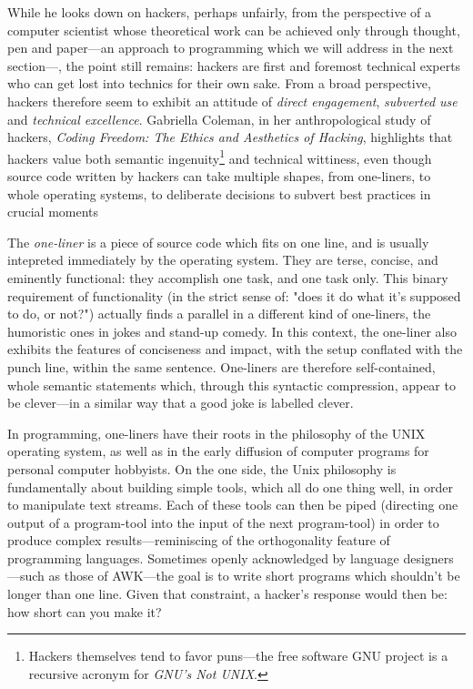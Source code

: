 While he looks down on hackers, perhaps unfairly, from the perspective of a computer scientist whose theoretical work can be achieved only through thought, pen and paper—an approach to programming which we will address in the next section—, the point still remains: hackers are first and foremost technical experts who can get lost into technics for their own sake. From a broad perspective, hackers therefore seem to exhibit an attitude of \emph{direct engagement}, \emph{subverted use} and \emph{technical excellence}.  Gabriella Coleman, in her anthropological study of hackers, \emph{Coding Freedom: The Ethics and Aesthetics of Hacking}, highlights that hackers value both semantic ingenuity\footnote{Hackers themselves tend to favor puns—the free software GNU project is a recursive acronym for \emph{GNU's Not UNIX}.} and technical wittiness, even though source code written by hackers can take multiple shapes, from one-liners, to whole operating systems, to deliberate decisions to subvert best practices in crucial moments

The \emph{one-liner} is a piece of source code which fits on one line, and is usually intepreted immediately by the operating system. They are terse, concise, and eminently functional: they accomplish one task, and one task only. This binary requirement of functionality (in the strict sense of: "does it do what it's supposed to do, or not?") actually finds a parallel in a different kind of one-liners, the humoristic ones in jokes and stand-up comedy. In this context, the one-liner also exhibits the features of conciseness and impact, with the setup conflated with the punch line, within the same sentence. One-liners are therefore self-contained, whole semantic statements which, through this syntactic compression, appear to be clever—in a similar way that a good joke is labelled clever.

In programming, one-liners have their roots in the philosophy of the UNIX operating system, as well as in the early diffusion of computer programs for personal computer hobbyists\cite{montfort_10_2014}. On the one side, the Unix philosophy is fundamentally about building simple tools, which all do one thing well, in order to manipulate text streams\cite{raymond_art_2003}. Each of these tools can then be piped (directing one output of a program-tool into the input of the next program-tool) in order to produce complex results—reminiscing of the orthogonality feature of programming languages. Sometimes openly acknowledged by language designers—such as those of AWK—the goal is to write short programs which shouldn't be longer than one line. Given that constraint, a hacker's response would then be: how short can you make it?


